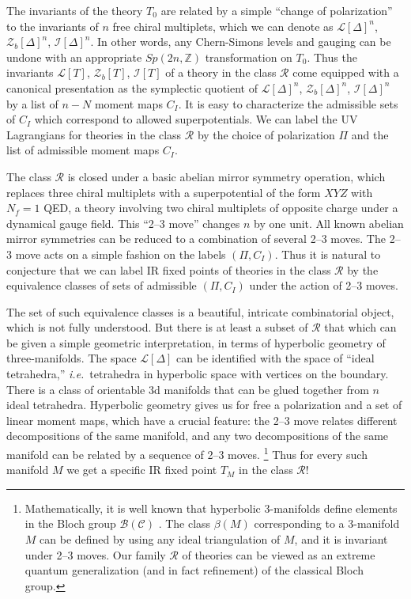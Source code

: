 \documentclass[11pt,letterpaper]{article}
\numberwithin{equation}{section}
\newcommand{\ie}{\emph{i.e.}}
\newcommand{\Z}{{\mathbb Z}}
\newcommand{\CB}{\mathcal{B}}
\newcommand{\CC}{\mathcal{C}}
\newcommand{\CI}{\mathcal{I}}
\newcommand{\CL}{\mathcal{L}}
\newcommand{\CR}{\mathcal{R}}
\newcommand{\CZ}{\mathcal{Z}}
\begin{document}
The invariants of the theory $T_0$ are related by a simple ``change of polarization'' to the invariants of $n$ free chiral multiplets, which we can denote
as $\CL[\Delta]^n$, $\CZ_b[\Delta]^n$, $\CI[\Delta]^n$.
In other words, any Chern-Simons levels and gauging can be undone with an appropriate $Sp(2n,\Z)$ transformation \cite{Witten-SL2} on $T_0$.
Thus the invariants  $\CL[T]$, $\CZ_b[T]$, $\CI[T]$ of a theory in the class $\CR$ come equipped with a canonical presentation as the symplectic quotient
of $\CL[\Delta]^n$, $\CZ_b[\Delta]^n$, $\CI[\Delta]^n$ by a list of $n-N$  moment maps $C_I$. It is easy to characterize the admissible sets of $C_I$
which correspond to allowed superpotentials. We can label the UV Lagrangians for theories in the class $\CR$ by
the choice of polarization $\Pi$ and the list of admissible moment maps $C_I$.

The class $\CR$ is closed under a basic abelian mirror symmetry operation, which replaces three chiral multiplets with a superpotential of the form $XYZ$
with $N_f=1$ QED, a theory involving two chiral multiplets of opposite charge under a dynamical gauge field. This ``2--3 move'' changes $n$ by one unit.
All known abelian mirror symmetries can be reduced to a combination of several 2--3 moves. The 2--3 move acts on a simple fashion on the labels $(\Pi, C_I)$.
Thus it is natural to conjecture that we can label IR fixed points of theories in the class $\CR$ by the equivalence classes of
sets of admissible $(\Pi, C_I)$ under the action of 2--3 moves.

The set of such equivalence classes is a beautiful, intricate combinatorial object, which is not fully understood. But there is at least a subset
of $\CR$ that which can be given a simple geometric interpretation, in terms of hyperbolic geometry of three-manifolds. The space $\CL[\Delta]$
can be identified with the space of ``ideal tetrahedra,'' \ie\ tetrahedra in hyperbolic space with vertices on the boundary.
There is a class of orientable 3d manifolds that can be glued together from $n$ ideal tetrahedra.
Hyperbolic geometry gives us for free a polarization \cite{NZ} and a set of linear moment maps, which have a crucial feature:
the 2--3 move relates different decompositions of the same manifold, and any two decompositions of the same manifold can be related by a sequence of 2--3 moves.%
%
\footnote{\label{foot:Bloch}Mathematically, it is well known that hyperbolic 3-manifolds define elements in the Bloch group $\CB(\CC)$ \cite{Bloch-regulators, DupontSah-scissors, neumann-1997}. The class $\beta(M)$ corresponding to a 3-manifold $M$ can be defined by using any ideal triangulation of $M$, and it is invariant under 2--3 moves. Our family $\CR$ of theories can be viewed as an extreme quantum generalization (and in fact refinement) of the classical Bloch group.} %
%
Thus for every such manifold $M$ we get a specific IR fixed point $T_M$ in the class $\CR$!
\end{document}
